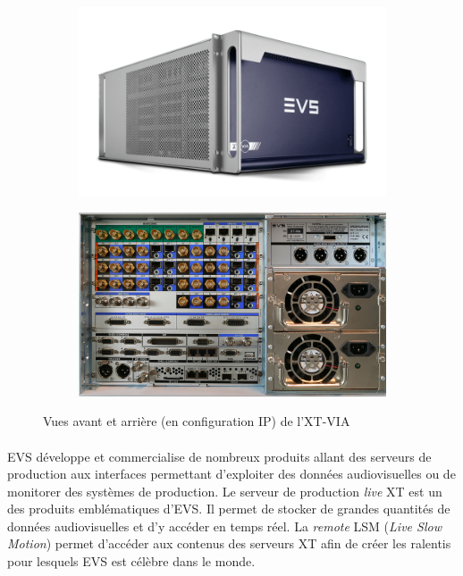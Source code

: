 \documentclass{article}
\begin{document}
    \begin{figure}[H]
        \centering
        \begin{subfigure}[b]{0.4\linewidth}
            \includegraphics[width=\linewidth]{./images/XT-VIA.png}
        \end{subfigure}
        \begin{subfigure}[b]{0.4\linewidth}
            \includegraphics[width=\linewidth]{./images/XT-VIA-ar.jpg}
        \end{subfigure}
        \caption{Vues avant et arrière (en configuration IP) de l'XT-VIA}
        \label{fig:xt-via}
    \end{figure}

    \paragraph{}
    EVS développe et commercialise de nombreux produits allant des serveurs de production aux interfaces permettant d'exploiter des données audiovisuelles ou de monitorer des systèmes de production\cite{EVS:products}. Le serveur de production \emph{live} XT est un des produits emblématiques d'EVS. Il permet de stocker de grandes quantités de données audiovisuelles et d'y accéder en temps réel. La \emph{remote} LSM (\emph{Live Slow Motion}) permet d'accéder aux contenus des serveurs XT afin de créer les ralentis pour lesquels EVS est célèbre dans le monde.
\end{document}

